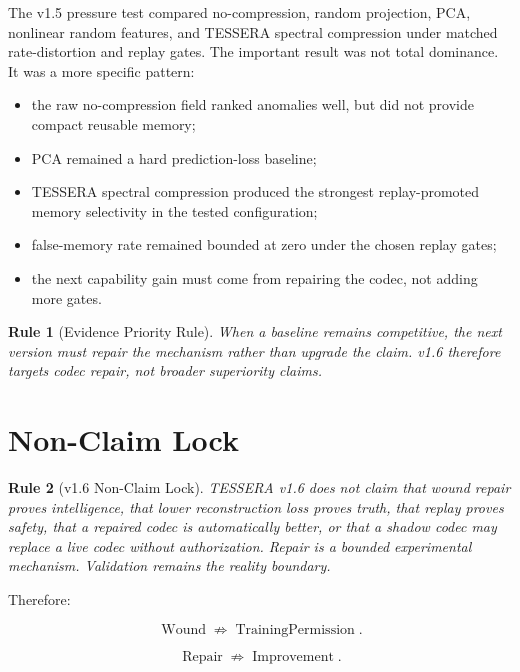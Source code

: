 \documentclass[12pt]{article}
\newtheorem{rulebox}{Rule}
\begin{document}
The v1.5 pressure test compared no-compression, random projection, PCA,
nonlinear random features, and TESSERA spectral compression under matched
rate-distortion and replay gates. The important result was not total dominance.
It was a more specific pattern:

\begin{itemize}
\item the raw no-compression field ranked anomalies well, but did not provide
compact reusable memory;
\item PCA remained a hard prediction-loss baseline;
\item TESSERA spectral compression produced the strongest replay-promoted
memory selectivity in the tested configuration;
\item false-memory rate remained bounded at zero under the chosen replay gates;
\item the next capability gain must come from repairing the codec, not adding
more gates.
\end{itemize}

\begin{rulebox}[Evidence Priority Rule]
When a baseline remains competitive, the next version must repair the mechanism
rather than upgrade the claim. v1.6 therefore targets codec repair, not broader
superiority claims.
\end{rulebox}

\section{Non-Claim Lock}

\begin{rulebox}[v1.6 Non-Claim Lock]
TESSERA v1.6 does not claim that wound repair proves intelligence, that lower
reconstruction loss proves truth, that replay proves safety, that a repaired
codec is automatically better, or that a shadow codec may replace a live codec
without authorization. Repair is a bounded experimental mechanism. Validation
remains the reality boundary.
\end{rulebox}

Therefore:

\[
\operatorname{Wound}\not\Rightarrow\operatorname{TrainingPermission}.
\]

\[
\operatorname{Repair}\not\Rightarrow\operatorname{Improvement}.
\]
\end{document}
